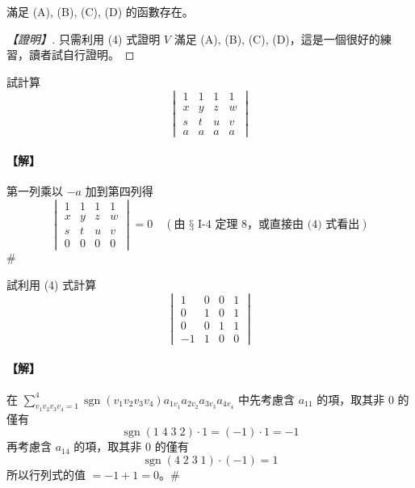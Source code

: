 \begin{theorem}\label{thm:b6-1-11}
滿足 (A), (B), (C), (D) 的函數存在。
\end{theorem}

\begin{proof}[【證明】]
只需利用 (4) 式證明 $V$ 滿足 (A), (B), (C), (D)，這是一個很好的練習，讀者試自行證明。
\end{proof}

\begin{example}\label{ex:b6-1-22}
試計算
\[ \begin{vmatrix}
1 & 1 & 1 & 1 \\
x & y & z & w \\
s & t & u & v \\
a & a & a & a
\end{vmatrix} \]
\end{example}

\paragraph{【解】}
第一列乘以 $-a$ 加到第四列得
\[ \begin{vmatrix}
1 & 1 & 1 & 1 \\
x & y & z & w \\
s & t & u & v \\
0 & 0 & 0 & 0
\end{vmatrix} = 0 \quad (\text{由 § I-4 定理 8，或直接由 (4) 式看出}) \]\hfill$\#$

\begin{example}\label{ex:b6-1-23}
試利用 (4) 式計算
\[ \begin{vmatrix}
1 & 0 & 0 & 1 \\
0 & 1 & 0 & 1 \\
0 & 0 & 1 & 1 \\
-1 & 1 & 0 & 0
\end{vmatrix} \]
\end{example}

\paragraph{【解】}
在 $\sum_{v_1 v_2 v_3 v_4=1}^4 \operatorname{sgn}(v_1 v_2 v_3 v_4) a_{1v_1} a_{2v_2} a_{3v_3} a_{4v_4}$ 中先考慮含 $a_{11}$ 的項，取其非 0 的僅有
\[ \operatorname{sgn}(1 \; 4 \; 3 \; 2) \cdot 1 = (-1) \cdot 1 = -1 \]
再考慮含 $a_{14}$ 的項，取其非 0 的僅有
\[ \operatorname{sgn}(4 \; 2 \; 3 \; 1) \cdot (-1) = 1 \]
所以行列式的值 $=-1 + 1 = 0$。\hfill$\#$

